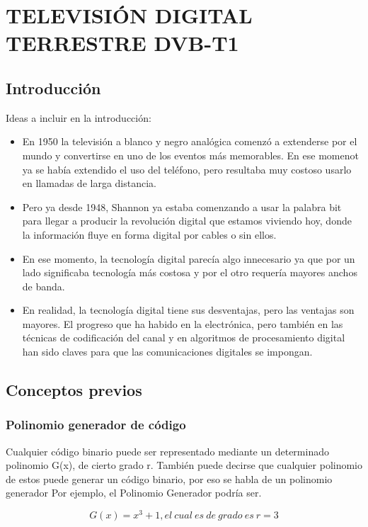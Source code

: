 \chapter{TELEVISIÓN DIGITAL TERRESTRE DVB-T1}
\section{Introducción}

Ideas a incluir en la introducción:

\begin{itemize}
    \item En 1950 la televisión a blanco y negro analógica comenzó a extenderse por el mundo y convertirse en uno de los eventos más memorables. En ese momenot ya se había extendido el uso del teléfono, pero resultaba muy costoso usarlo en llamadas de larga distancia.
    \item Pero ya desde 1948, Shannon ya estaba comenzando a usar la palabra bit para llegar a producir la revolución digital que estamos viviendo hoy, donde la información fluye en forma digital por cables o sin ellos.
    \item En ese momento, la tecnología digital parecía algo innecesario ya que por un lado significaba tecnología más costosa y por el otro requería mayores anchos de banda. 
    \item En realidad, la tecnología digital tiene sus desventajas, pero las ventajas son mayores. El progreso que ha habido en la electrónica, pero también en las técnicas de codificación del canal y en algoritmos de procesamiento digital han sido claves para que las comunicaciones digitales se impongan.
\end{itemize}

\section{Conceptos previos}

\subsection{Polinomio generador de código}

Cualquier código binario puede ser representado mediante un determinado polinomio G(x), de cierto grado r. También puede decirse que cualquier polinomio de estos puede generar un código binario, por eso se habla de un polinomio generador Por ejemplo, el Polinomio Generador podría ser. 

\begin{equation} \label{capsiete_uno}
G(x)=x^{3}+1, el \ cual \ es \  de  \ grado \ es \ r=3
\end{equation}


